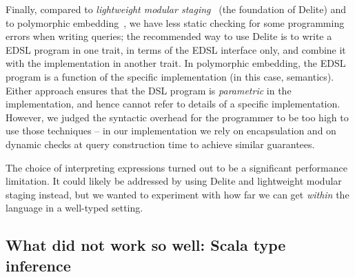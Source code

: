 Finally, compared to \emph{lightweight modular staging}~\citep{rompf2010lightweight} (the foundation of Delite) and to polymorphic embedding~\citep{hofer08polymorphic}, we have less static checking for some programming errors when writing queries; the recommended way to use Delite is to write a EDSL program in one trait, in terms of the EDSL interface only, and combine it with the implementation in another trait. In polymorphic embedding, the EDSL program is a function of the specific implementation (in this case, semantics).
Either approach ensures that the DSL program is \emph{parametric} in the implementation, and hence cannot refer to details of a specific implementation.
However, we judged the syntactic overhead for the programmer to be too high to use those techniques -- in our implementation we rely on encapsulation and on dynamic checks at query construction time to achieve similar guarantees.

The choice of interpreting expressions turned out to be a significant performance limitation. It could likely be addressed by using Delite and lightweight modular staging instead, but we wanted to experiment with how far we can get \emph{within} the language in a well-typed setting.


\subsection{What did not work so well: Scala type inference}
\label{sec:ScalaLessons}

%
%
%

